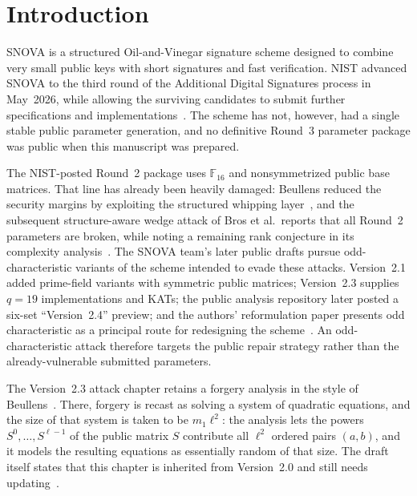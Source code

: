 \documentclass[11pt]{article}
\newcommand{\F}{\mathbb F}
\newcommand{\SNOVA}{\textsf{SNOVA}}
\begin{document}
\section{Introduction}\label{sec:intro}

\SNOVA{} is a structured Oil-and-Vinegar signature scheme designed to combine very small public keys with short signatures and fast verification.  NIST advanced \SNOVA{} to the third round of the Additional Digital Signatures process in May~2026, while allowing the surviving candidates to submit further specifications and implementations~\cite{NISTIR8610,NISTRound3}.  The scheme has not, however, had a single stable public parameter generation, and no definitive Round~3 parameter package was public when this manuscript was prepared.

The NIST-posted Round~2 package uses $\F_{16}$ and nonsymmetrized public base matrices.  That line has already been heavily damaged: Beullens reduced the security margins by exploiting the structured whipping layer~\cite{Beullens2024SNOVA}, and the subsequent structure-aware wedge attack of Bros et al.\ reports that all Round~2 parameters are broken, while noting a remaining rank conjecture in its complexity analysis~\cite{BrosEtAl2026SNOVAWedge}.  The \SNOVA{} team's later public drafts pursue odd-characteristic variants of the scheme intended to evade these attacks.  Version~2.1 added prime-field variants with symmetric public matrices; Version~2.3 supplies $q=19$ implementations and KATs; the public analysis repository later posted a six-set ``Version~2.4'' preview; and the authors' reformulation paper presents odd characteristic as a principal route for redesigning the scheme~\cite{SNOVA23,SNOVA24Preview,DingEtAl2026Reformulating}.  An odd-characteristic attack therefore targets the public repair strategy rather than the already-vulnerable submitted parameters.

The Version~2.3 attack chapter retains a forgery analysis in the style of Beullens~\cite{Beullens2024SNOVA}.  There, forgery is recast as solving a system of quadratic equations, and the size of that system is taken to be $m_1\ell^2$: the analysis lets the powers $S^0,\dots,S^{\ell-1}$ of the public matrix $S$ contribute all $\ell^2$ ordered pairs $(a,b)$, and it models the resulting equations as essentially random of that size.  The draft itself states that this chapter is inherited from Version~2.0 and still needs updating~\cite{SNOVA23}.
\end{document}
